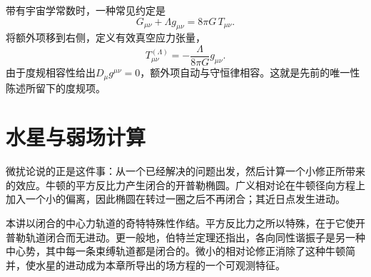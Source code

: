 \begin{classroomqa}
\end{classroomqa}

带有宇宙学常数时，一种常见约定是
\begin{equation}
 G_{\mu\nu}+\Lambda g_{\mu\nu}
 =
 8\pi G\,T_{\mu\nu}.
\end{equation}
将额外项移到右侧，定义有效真空应力张量，
\begin{equation}
 T_{\mu\nu}^{(\Lambda)}
 =
 -\frac{\Lambda}{8\pi G}g_{\mu\nu}.
\end{equation}
由于度规相容性给出\(D_\mu g^{\mu\nu}=0\)，额外项自动与守恒律相容。这就是先前的唯一性陈述所留下的度规项。

\section{水星与弱场计算}

\begin{classroomqa}
\end{classroomqa}

微扰论说的正是这件事：从一个已经解决的问题出发，然后计算一个小修正所带来的效应。牛顿的平方反比力产生闭合的开普勒椭圆。广义相对论在牛顿径向方程上加入一个小的偏离，因此椭圆在转过一圈之后不再闭合；其近日点发生进动。

本讲以闭合的中心力轨道的奇特特殊性作结。平方反比力之所以特殊，在于它使开普勒轨道闭合而无进动。更一般地，伯特兰定理还指出，各向同性谐振子是另一种中心势，其中每一条束缚轨道都是闭合的。微小的相对论修正消除了这种牛顿简并，使水星的进动成为本章所导出的场方程的一个可观测特征。